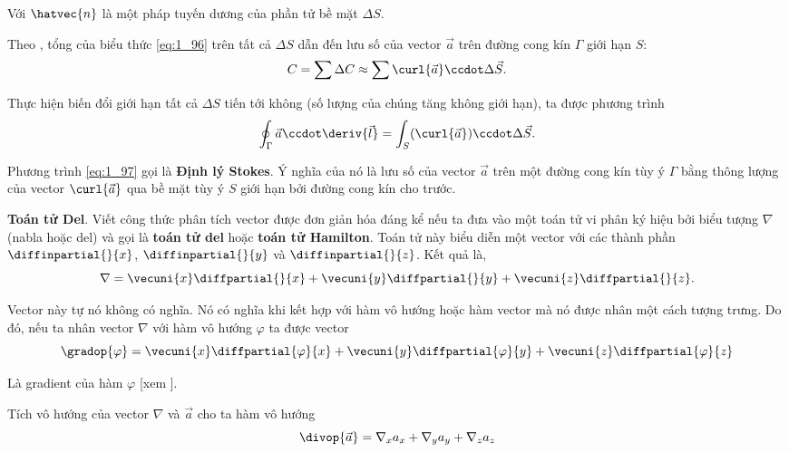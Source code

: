 \noindent
Với $\hatvec{n}$ là một pháp tuyến dương của phần tử bề mặt $\Delta{S}$.

Theo , tổng của biểu thức \eqref{eq:1_96} trên tất cả $\Delta{S}$ dẫn đến lưu số của vector $\vec{a}$ trên đường cong kín $\Gamma$ giới hạn $S$:
\begin{equation*}
	C = \sum\Delta{C} \approx \sum\curl{\vec{a}} \ccdot \Delta{\vec{S}}.
\end{equation*}

\noindent
Thực hiện biến đổi giới hạn tất cả $\Delta{S}$ tiến tới không (số lượng của chúng tăng không giới hạn), ta được phương trình
\begin{equation}\label{eq:1_97}
	\oint_{\Gamma} \vec{a}\ccdot\deriv{\vec{l}} = \int_S (\curl{\vec{a}}) \ccdot \Delta{\vec{S}}.
\end{equation}

\noindent
Phương trình \eqref{eq:1_97} gọi là \textbf{Định lý Stokes}. Ý nghĩa của nó là lưu số của vector $\vec{a}$ trên một đường cong kín tùy ý $\Gamma$ bằng thông lượng của vector $\curl{\vec{a}}$ qua bề mặt tùy ý $S$ giới hạn bởi đường cong kín cho trước.

\textbf{Toán tử Del}. Viết công thức phân tích vector được đơn giản hóa đáng kể nếu ta đưa vào một toán tử vi phân ký hiệu bởi biểu tượng $\nabla$ (nabla hoặc del) và gọi là \textbf{toán tử del} hoặc \textbf{toán tử Hamilton}. Toán tử này biểu diễn một vector với các thành phần $\diffinpartial{}{x}$, $\diffinpartial{}{y}$ và $\diffinpartial{}{z}$. Kết quả là,
\vspace{-10pt}
\begin{equation}\label{eq:1_98}
	\nabla = \vecuni{x}\diffpartial{}{x} + \vecuni{y}\diffpartial{}{y} + \vecuni{z}\diffpartial{}{z}.
\end{equation}

\noindent
Vector này tự nó không có nghĩa. Nó có nghĩa khi kết hợp với hàm vô hướng hoặc hàm vector mà nó được nhân một cách tượng trưng. Do đó, nếu ta nhân vector $\nabla$ với hàm vô hướng $\varphi$ ta được vector
\begin{equation}\label{eq:1_99}
	\gradop{\varphi} = \vecuni{x}\diffpartial{\varphi}{x} + \vecuni{y}\diffpartial{\varphi}{y} + \vecuni{z}\diffpartial{\varphi}{z}
\end{equation}

\noindent
Là gradient của hàm $\varphi$ [xem ].

Tích vô hướng của vector $\nabla$ và $\vec{a}$ cho ta hàm vô hướng
\begin{equation}\label{eq:1_100}
	\divop{\vec{a}} = \nabla_{x}a_{x} + \nabla_{y}a_{y} + \nabla_{z}a_{z}
\end{equation}

